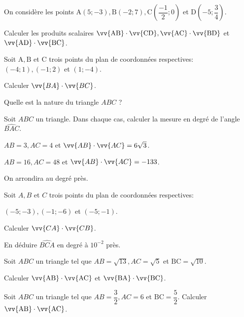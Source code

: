\documentclass[11pt,a4paper]{article}  %
\begin{document}
\exercice{}

On considère les points $\mathrm{A}(5 ;-3), \mathrm{B}(-2 ; 7), \mathrm{C}\left(\dfrac{-1}{2} ; 0\right)$ et $\mathrm{D}\left(-5 ; \dfrac{3}{4}\right)$. 

Calculer les produits scalaires $\vv{\mathrm{AB}} \cdot \vv{\mathrm{CD}}, \vv{\mathrm{AC}} \cdot \vv{\mathrm{BD}}$ et $\vv{\mathrm{AD}} \cdot \vv{\mathrm{BC}}$.

\exercice{}

Soit $\mathrm{A}, \mathrm{B}$ et C trois points du plan de coordonnées respectives: $(-4 ; 1),(-1 ; 2)$ et $(1 ;-4)$.
\begin{enumMet}
	\item Calculer $\vv{B A} \cdot \vv{B C}$.
	\item Quelle est la nature du triangle $A B C$ ?
\end{enumMet}

\exercice{}

Soit $A B C$ un triangle. Dans chaque cas, calculer la mesure en degré de l'angle $\widehat{B A C}$.
\begin{enumMet}
	\item $A B=3, A C=4$ et $\vv{A B} \cdot \vv{A C}=6 \sqrt{3}$.
	\item $A B=16, A C=48$ et $\vv{A B} \cdot \vv{A C}=-133$.
\end{enumMet}

On arrondira au degré près.

\exercice{}

Soit $A, B$ et $C$ trois points du plan de coordonnées respectives:

$(-5 ;-3),(-1 ;-6)$ et $(-5 ;-1)$.
\begin{enumMet}
	\item Calculer $\vv{C A} \cdot \vv{C B}$.
	\item En déduire $\widehat{B C A}$ en degré à $10^{-2}$ près.
\end{enumMet}

\exercice{}

Soit $A B C$ un triangle tel que $A B=\sqrt{13}, A C=\sqrt{5}$ et $\mathrm{BC}=\sqrt{10}$. 

Calculer $\vv{\mathrm{AB}} \cdot \vv{\mathrm{AC}}$ et $\vv{\mathrm{BA}} \cdot \vv{\mathrm{BC}}$.

\exercice{}

Soit $A B C$ un triangle tel que $A B=\dfrac{3}{2}, A C=6$ et $\mathrm{BC}=\dfrac{5}{2}$. Calculer $\vv{\mathrm{AB}} \cdot \vv{\mathrm{AC}}$.
\end{document}
